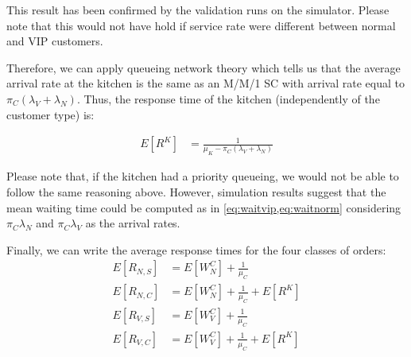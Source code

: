 This result has been confirmed by the validation runs on the simulator. 
Please note that this would not have hold if service rate were different between
normal and VIP customers.

Therefore, we can apply queueing network theory which tells us that the average 
arrival rate at the kitchen is the same as an M/M/1 SC with arrival rate equal 
to $\pi_C(\lambda_V+\lambda_N)$. Thus, the response time of the kitchen 
(independently of the customer type) is:

\begin{align}
    E[R^K] &= \frac{1}{\mu_K-\pi_C(\lambda_{V}+\lambda_{N})}
\end{align}

Please note that, if the kitchen had a priority queueing, we would not be able
to follow the same reasoning above. However, simulation results suggest that 
the mean waiting time could be computed as in \cref{eq:waitvip,eq:waitnorm}
considering $\pi_C \lambda_N$ and $\pi_C \lambda_V$ as the arrival rates.

Finally, we can write the average response times for the four classes of orders:
\begin{align}
    E[R_{N,S}] &= E[W^C_{N}] + \frac{1}{\mu_C} \\
    E[R_{N,C}] &= E[W^C_{N}] + \frac{1}{\mu_C} + E[R^K] \\
    E[R_{V,S}] &= E[W^C_{V}] + \frac{1}{\mu_C} \\
    E[R_{V,C}] &= E[W^C_{V}] + \frac{1}{\mu_C} + E[R^K]
\end{align}
